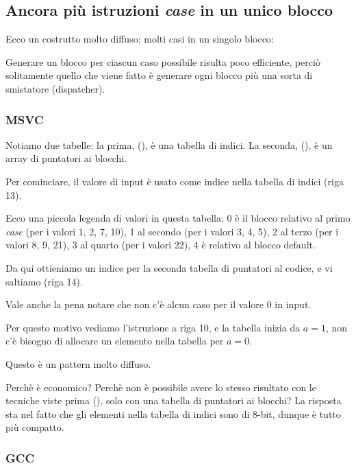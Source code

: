 \subsection{Ancora più istruzioni \emph{case} in un unico blocco}

Ecco un costrutto molto diffuso: molti casi in un singolo blocco:


Generare un blocco per ciascun caso possibile risulta poco efficiente, perciò solitamente quello che viene fatto è generare
ogni blocco più una sorta di smistatore (dispatcher).

\subsubsection{MSVC}



Notiamo due tabelle: la prima, (), è una tabella di indici. La seconda, (), è un array di puntatori ai blocchi.

Per cominciare, il valore di input è usato come indice nella tabella di indici (riga 13).

Ecco una piccola legenda di valori in questa tabella:
0 è il blocco relativo al primo \emph{case} (per i valori 1, 2, 7, 10),
1 al secondo (per i valori 3, 4, 5),
2 al terzo (per i valori 8, 9, 21),
3 al quarto (per i valori 22),
4 è relativo al blocco default.

Da qui ottieniamo un indice per la seconda tabella di puntatori al codice, e vi saltiamo (riga 14).

Vale anche la pena notare che non c'è alcun caso per il valore 0 in input.

Per questo motivo vediamo l'istruzione \DEC a riga 10, e la tabella inizia da $a=1$, 
non c'è bisogno di allocare un elemento nella tabella per $a=0$.

Questo è un pattern molto diffuso.

Perchè è economico? Perchè non è possibile avere lo stesso risultato con le tecniche viste prima 
(), solo con una tabella di puntatori ai blocchi?
La risposta sta nel fatto che gli elementi nella tabella di indici sono di 8-bit, dunque è tutto più compatto.

\subsubsection{GCC}

